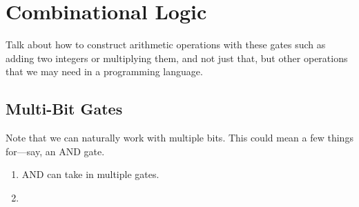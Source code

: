 \section{Combinational Logic}

  Talk about how to construct arithmetic operations with these gates such as adding two integers or multiplying them, and not just that, but other operations that we may need in a programming language. 

\subsection{Multi-Bit Gates}

  Note that we can naturally work with multiple bits. This could mean a few things for---say, an AND gate. 
  \begin{enumerate}
    \item AND can take in multiple gates. 
    \item 
  \end{enumerate}

  \begin{definition}
    
  \end{definition}

  \begin{definition}
    
  \end{definition}

  \begin{definition}
    
  \end{definition}

  \begin{definition}
    
  \end{definition}

  \begin{definition}
    
  \end{definition}

  \begin{definition}
    
  \end{definition}

  \begin{definition}
    
  \end{definition}

